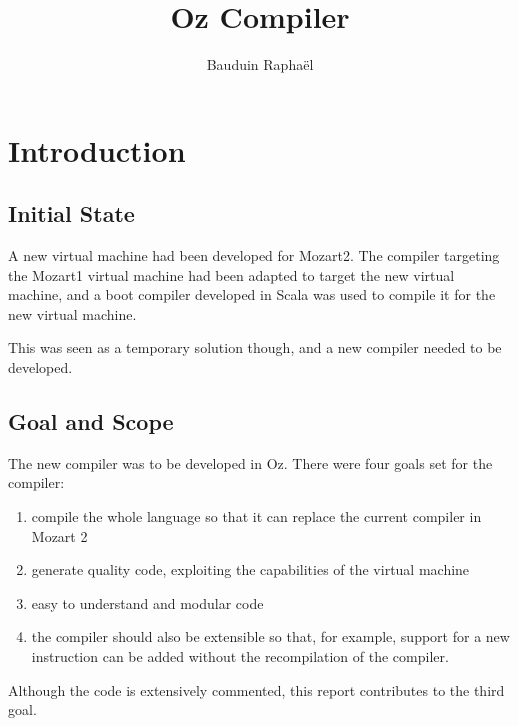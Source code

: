 \documentclass[a4paper]{memoir}
\author{Bauduin Raphaël}
\title{Oz Compiler}
\begin{document}
\newcommand{\nav}[1]{#1}
\renewcommand{\topfraction}{.85}
\renewcommand{\bottomfraction}{.7}
\renewcommand{\textfraction}{.15}
\renewcommand{\floatpagefraction}{.66}
\renewcommand{\dbltopfraction}{.66}
\renewcommand{\dblfloatpagefraction}{.66}
\setcounter{topnumber}{9}
\setcounter{bottomnumber}{9}
\setcounter{totalnumber}{20}
\setcounter{dbltopnumber}{9}

\lstset{language=Oz,basicstyle=\ttfamily\small,columns=fullflexible,keepspaces=true,
escapechar=µ}

\ifdraftdoc
{}
\fi

\immediate{} 

\maketitle
\tableofcontents


\chapter{Introduction}
\section{Initial State}
A new virtual machine had been developed for Mozart2. The compiler
targeting the Mozart1 virtual machine had been adapted to target the new
virtual machine, and a boot compiler developed in Scala was used to compile it
for the new virtual machine.

This was seen as a temporary solution though, and a new compiler needed
to be developed. 


\section{Goal and Scope}
The new compiler was to be developed in Oz.
There were four goals set for the compiler:
\begin{enumerate}
  \item compile the whole language so that it can replace the current compiler in Mozart 2
  \item generate quality code, exploiting the capabilities of the virtual machine
  \item easy to understand and modular code
  \item the compiler should also be extensible so that, for example, support for a new instruction can be added without the recompilation of the compiler.
\end{enumerate}
Although the code is extensively commented, this report contributes to the third goal.
\end{document}
